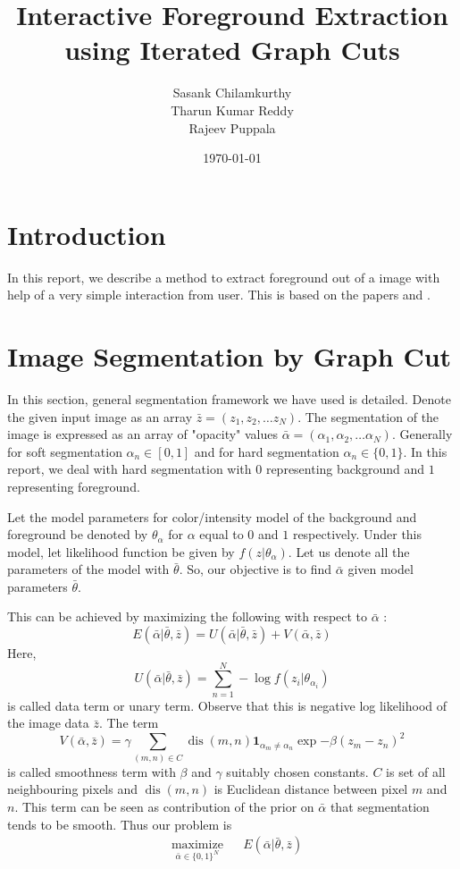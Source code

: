 \documentclass[a4paper]{article}
\begin{document}
\title{Interactive Foreground Extraction using Iterated Graph Cuts}
\author{Sasank Chilamkurthy\\Tharun Kumar Reddy\\Rajeev Puppala}
\date{\today}
\maketitle

\section{Introduction}
In this report, we describe a method to extract foreground out of a image with help of a very simple interaction from user. This is based on the papers \cite{1} and \cite{2}.

\section{Image Segmentation by Graph Cut}
In this section, general segmentation framework we have used is detailed. Denote the given input image as an array $\bar{z} = (z_1, z_2, \dots z_N)$. 
The segmentation of the image is expressed as an array of "opacity" values $\bar{\alpha} = (\alpha_1, \alpha_2, \dots \alpha_N)$. 
Generally for soft segmentation  $\alpha_n \in [0,1]$ and for hard segmentation $\alpha_n \in \{0,1\}$. 
In this report, we deal with hard segmentation with $0$ representing background and $1$ representing foreground.

Let the model parameters for color/intensity model of the background and foreground be denoted by $\theta_\alpha$ for $\alpha$ equal to $0$ and $1$ respectively. 
Under this model, let likelihood function be given by $f(z|\theta_\alpha)$. Let us denote all the parameters of the model with $\bar{\theta}$.
So, our objective is to find $\bar{\alpha}$ given model parameters $\bar{\theta}$.

This can be achieved by maximizing the following with respect to $\bar{\alpha}$ :
\[ 
E(\bar{\alpha}| \bar{\theta},\bar{z} ) = U(\bar{\alpha}| \bar{\theta},\bar{z}) + V(\bar{\alpha},\bar{z})
\]
Here, 
\[
U(\bar{\alpha}| \bar{\theta},\bar{z}) = \sum_{n=1}^N -\log f(z_i | \theta_{\alpha_i})
\] 
is called data term or unary term. Observe that this is negative log likelihood of the image data $\bar{z}$. The term
\[
V(\bar{\alpha},\bar{z}) = \gamma \sum_{(m,n) \in C} \operatorname{dis}(m,n) \mathbf{1}_{\alpha_m \neq \alpha_n} \exp{-\beta(z_m-z_n)^2}
\]
is called smoothness term with $\beta$ and $\gamma$ suitably chosen constants. $C$ is set of all neighbouring pixels and $\operatorname{dis}(m,n)$ is Euclidean distance between pixel $m$ and $n$.  
This term can be seen as contribution of the prior on $\bar{\alpha}$ that segmentation tends to be smooth. Thus our problem is 
\begin{equation}
\begin{aligned}
& \underset{\bar{\alpha}\in\{0,1 \}^N}{\text{maximize}}
& & E(\bar{\alpha}| \bar{\theta},\bar{z} )
\end{aligned}
\end{equation}
\end{document}
